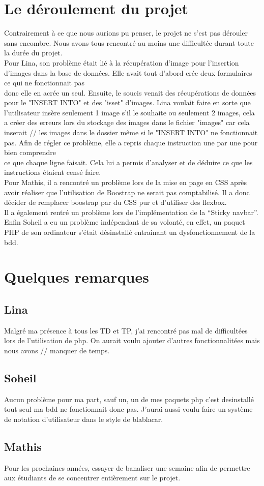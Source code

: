 \documentclass[11pt,a4paper]{article}
\begin{document}
\section{Le déroulement du projet}
Contrairement à ce que nous aurions pu penser, le projet ne s'est pas dérouler sans encombre. Nous avons tous rencontré au moins une difficultée durant toute la durée du projet.\\
Pour Lina, son problème était lié à la récupération d'image pour l'insertion d'images dans la base de données. Elle avait tout d'abord crée deux formulaires ce qui ne fonctionnait pas \\
donc elle en acrée un seul. Ensuite, le soucis venait des récupérations de données pour le "INSERT INTO" et des "isset" d'images. Lina voulait faire en sorte que\\
l'utilisateur insère seulement 1 image s'il le souhaite ou seulement 2 images, cela a créer des erreurs lors du stockage des images dans le fichier "images" car cela inserait //
les images dans le dossier même si le "INSERT INTO" ne fonctionnait pas. Afin de régler ce problème, elle a repris chaque instruction une par une pour bien comprendre\\
ce que chaque ligne faisait. Cela lui a permis d'analyser et de déduire ce que les instructions étaient censé faire.\\
Pour Mathis, il a rencontré un problème lors de la mise en page en CSS après avoir réaliser que l'utilisation de Boostrap ne serait pas comptabilisé. Il a donc décider de remplacer boostrap par du CSS pur et d'utiliser des flexbox.\\
Il a également rentré un problème lors de l'implémentation de la ``Sticky navbar''.\\
Enfin Soheil a eu un problème indépendant de sa volonté, en effet, un paquet PHP de son ordinateur s'était désinstallé entrainant un dysfonctionnement de la bdd.

\section{Quelques remarques}
\subsection*{Lina}
Malgré ma présence à tous les TD et TP, j'ai rencontré pas mal de difficultées lors de l'utilisation de php. On aurait voulu ajouter d'autres fonctionnalitées mais nous avons //
manquer de temps.
\subsection*{Soheil}
Aucun problème pour ma part, sauf un, un de mes paquets php c'est desinstallé tout seul ma bdd ne fonctionnait donc pas. J'aurai aussi voulu faire un système de notation d'utilisateur dans le style de blablacar.
\subsection*{Mathis}
Pour les prochaines années, essayer de banaliser une semaine afin de permettre aux étudiants de se concentrer entièrement sur le projet. 
\end{document}
